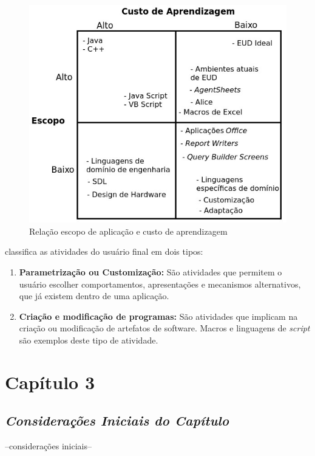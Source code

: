 \begin{figure}[h]
	\centering
	\label{fig01}
		\includegraphics[scale=0.8]{figuras/trade_off_eud_editado}
	\caption{Relação escopo de aplicação e custo de aprendizagem}
\end{figure}
\pagebreak

 classifica as atividades do usuário final em dois tipos:

\begin{enumerate}
\item \textbf{Parametrização ou Customização:} São atividades que permitem o usuário escolher comportamentos, apresentações e mecanismos  alternativos, que já existem dentro de uma aplicação.

\item \textbf{Criação e modificação de programas:} São atividades que implicam na criação ou modificação de artefatos de software. Macros e linguagens de \textit{script} são exemplos deste tipo de atividade.
\end{enumerate}

\chapter[Capítulo 3]{Capítulo 3}

\section{\textit{Considerações Iniciais do Capítulo}}
--considerações iniciais--

